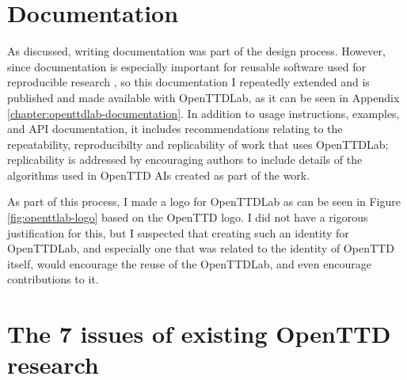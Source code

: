 \documentclass[logo,msc,dsti]{style/infthesis}    %
\begin{document}
{\section{Documentation}

As discussed, writing documentation was part of the design process. However, since documentation is especially important for reusable software used for reproducible research \cite{turingway2022}, so this documentation I repeatedly extended and is published and made available with OpenTTDLab, as it can be seen in Appendix \ref{chapter:openttdlab-documentation}. In addition to usage instructions, examples, and API documentation, it includes recommendations relating to the repeatability, reproducibilty and replicability of work that uses OpenTTDLab; replicability is addressed by encouraging authors to include details of the algorithms used in OpenTTD AIs created as part of the work.

As part of this process, I made a logo for OpenTTDLab as can be seen in Figure \ref{fig:openttlab-logo} based on the OpenTTD logo. I did not have a rigorous justification for this, but I suspected that creating such an identity for OpenTTDLab, and especially one that was related to the identity of OpenTTD itself, would encourage the reuse of the OpenTTDLab, and even encourage contributions to it.



\section{The 7 issues of existing OpenTTD research}

}
\end{document}
